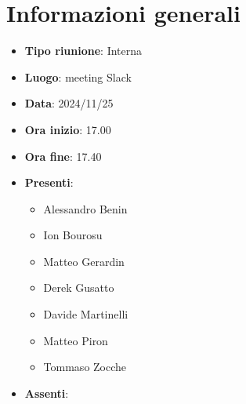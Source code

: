 \section{Informazioni generali}
\begin{itemize}
  \item \textbf{Tipo riunione}: Interna
  \item \textbf{Luogo}: meeting Slack
  \item \textbf{Data}: 2024/11/25
  \item \textbf{Ora inizio}: 17.00
  \item \textbf{Ora fine}: 17.40
  
  \item \textbf{Presenti}:
  \begin{itemize}
    \item Alessandro Benin
    \item Ion Bourosu
    \item Matteo Gerardin
    \item Derek Gusatto
    \item Davide Martinelli
    \item Matteo Piron
    \item Tommaso Zocche
  \end{itemize}

  \item \textbf{Assenti}:
 
\end{itemize}